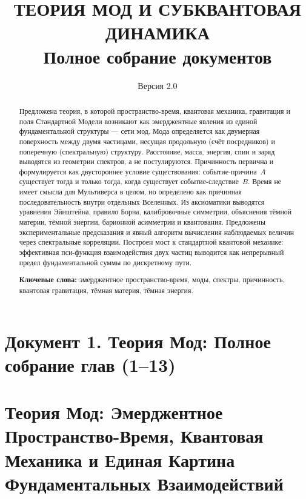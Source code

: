 \documentclass[12pt,a4paper]{article}
\title{\textbf{ТЕОРИЯ МОД И СУБКВАНТОВАЯ ДИНАМИКА}\\
\large Полное собрание документов}
\author{}
\date{Версия 2.0}
\begin{document}
\maketitle
\tableofcontents
\newpage


\section*{Документ 1. Теория Мод: Полное собрание глав (1--13)}

\section{Теория Мод: Эмерджентное Пространство-Время, Квантовая Механика и Единая Картина Фундаментальных Взаимодействий}

\begin{abstract}
Предложена теория, в которой пространство-время, квантовая механика, гравитация и поля Стандартной Модели возникают как эмерджентные явления из единой фундаментальной структуры --- сети мод. Мода определяется как двумерная поверхность между двумя частицами, несущая продольную (счёт посредников) и поперечную (спектральную) структуру. Расстояние, масса, энергия, спин и заряд выводятся из геометрии спектров, а не постулируются. Причинность первична и формулируется как двустороннее условие существования: событие-причина~$A$ существует тогда и только тогда, когда существует событие-следствие~$B$. Время не имеет смысла для Мультиверса в целом, но определено как причинная последовательность внутри отдельных Вселенных. Из аксиоматики выводятся уравнения Эйнштейна, правило Борна, калибровочные симметрии, объяснения тёмной материи, тёмной энергии, барионной асимметрии и квантования. Предложены экспериментальные предсказания и явный алгоритм вычисления наблюдаемых величин через спектральные корреляции. Построен мост к стандартной квантовой механике: эффективная пси-функция взаимодействия двух частиц выводится как непрерывный предел фундаментальной суммы по дискретному пути.

\bigskip
\noindent\textbf{Ключевые слова:} эмерджентное пространство-время, моды, спектры, причинность, квантовая гравитация, тёмная материя, тёмная энергия.
\end{abstract}
\end{document}
